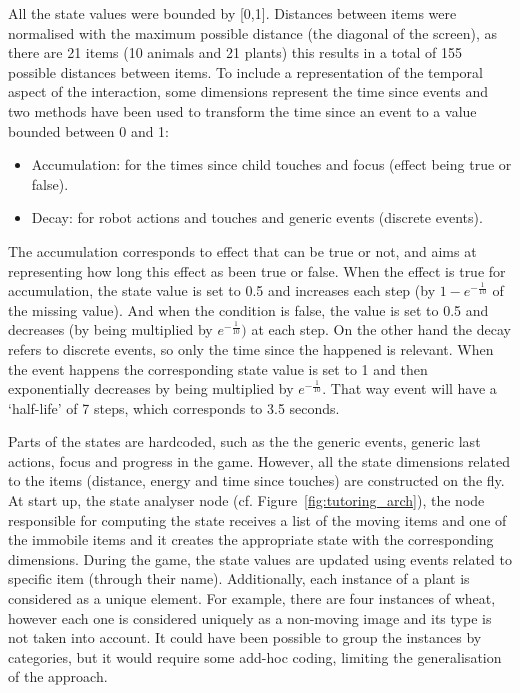 All the state values were bounded by [0,1]. Distances between items were normalised with the maximum possible distance (the diagonal of the screen), as there are 21 items (10 animals and 21 plants) this results in a total of 155 possible distances between items. To include a representation of the temporal aspect of the interaction, some dimensions represent the time since events and two methods have been used to transform the time since an event to a value bounded between 0 and 1:
\begin{itemize}
	\item Accumulation: for the times since child touches and focus (effect being true or false).
	\item Decay: for robot actions and touches and generic events (discrete events).
\end{itemize}

The accumulation corresponds to effect that can be true or not, and aims at representing how long this effect as been true or false. When the effect is true for accumulation, the state value is set to 0.5 and increases each step (by $1-e^{-\frac{1}{10}}$ of the missing value). And when the condition is false, the value is set to 0.5 and decreases (by being multiplied by $e^{-\frac{1}{10}})$ at each step. On the other hand the decay refers to discrete events, so only the time since the happened is relevant. When the event happens the corresponding state value is set to 1 and then exponentially decreases by being multiplied by $e^{-\frac{1}{10}}$. That way event will have a `half-life' of 7 steps, which corresponds to 3.5 seconds.

Parts of the states are hardcoded, such as the the generic events, generic last actions, focus and progress in the game. However, all the state dimensions related to the items (distance, energy and time since touches) are constructed on the fly. At start up, the state analyser node (cf. Figure~\ref{fig:tutoring_arch}), the node responsible for computing the state receives a list of the moving items and one of the immobile items and it creates the appropriate state with the corresponding dimensions. During the game, the state values are updated using events related to specific item (through their name). Additionally, each instance of a plant is considered as a unique element. For example, there are four instances of wheat, however each one is considered uniquely as a non-moving image and its type is not taken into account. It could have been possible to group the instances by categories, but it would require some add-hoc coding, limiting the generalisation of the approach. 


